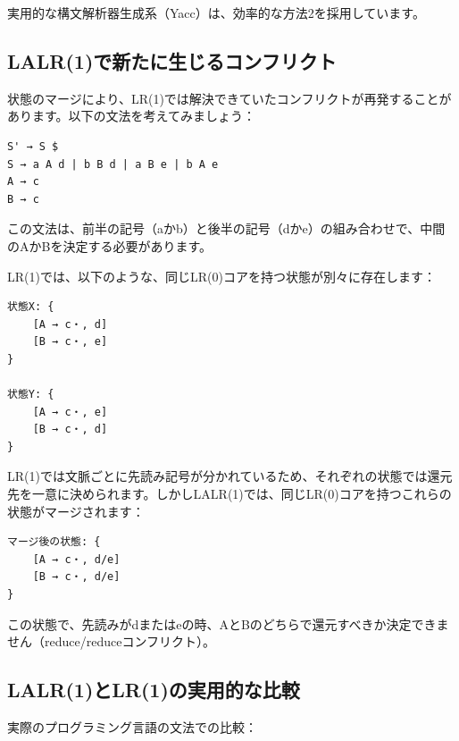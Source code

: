 実用的な構文解析器生成系（Yacc）は、効率的な方法2を採用しています。

\hypertarget{chapter5-lalr1ux3067ux65b0ux305fux306bux751fux3058ux308bux30b3ux30f3ux30d5ux30eaux30afux30c8}{%
\subsection{LALR(1)で新たに生じるコンフリクト}\label{chapter5-lalr1ux3067ux65b0ux305fux306bux751fux3058ux308bux30b3ux30f3ux30d5ux30eaux30afux30c8}}

状態のマージにより、LR(1)では解決できていたコンフリクトが再発することがあります。以下の文法を考えてみましょう：

\begin{verbatim}
S' → S $
S → a A d | b B d | a B e | b A e
A → c
B → c
\end{verbatim}

この文法は、前半の記号（aかb）と後半の記号（dかe）の組み合わせで、中間のAかBを決定する必要があります。

LR(1)では、以下のような、同じLR(0)コアを持つ状態が別々に存在します：

\begin{verbatim}
状態X: {
    [A → c・, d]
    [B → c・, e]
}

状態Y: {
    [A → c・, e]
    [B → c・, d]
}
\end{verbatim}

LR(1)では文脈ごとに先読み記号が分かれているため、それぞれの状態では還元先を一意に決められます。しかしLALR(1)では、同じLR(0)コアを持つこれらの状態がマージされます：

\begin{verbatim}
マージ後の状態: {
    [A → c・, d/e]
    [B → c・, d/e]
}
\end{verbatim}

この状態で、先読みがdまたはeの時、AとBのどちらで還元すべきか決定できません（reduce/reduceコンフリクト）。

\hypertarget{chapter5-lalr1ux3068lr1ux306eux5b9fux7528ux7684ux306aux6bd4ux8f03}{%
\subsection{LALR(1)とLR(1)の実用的な比較}\label{chapter5-lalr1ux3068lr1ux306eux5b9fux7528ux7684ux306aux6bd4ux8f03}}

実際のプログラミング言語の文法での比較：


